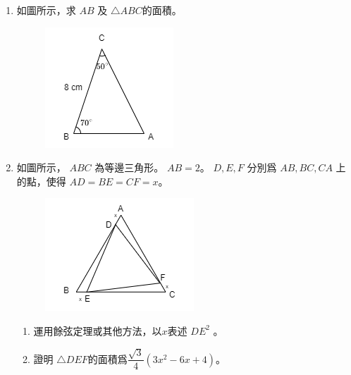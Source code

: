 \documentclass[11pt]{article}
\begin{document}
\begin{enumerate}
        \hrulefill
            
        \hrulefill
        
        \hrulefill
        
        \hrulefill
            
        \hrulefill
        
        \hrulefill

    \item 如圖所示，求 $AB$ 及 $\triangle ABC$的面積。\begin{figure}[H]
        \centering
        \includegraphics[scale=0.8]{f4finalq39.png}
    \end{figure}

    
        
        \hrulefill
            
        \hrulefill
        
        \hrulefill
        
        \hrulefill
        
        \hrulefill
        
        \hrulefill
        
        \hrulefill
        
        \hrulefill

    \pagebreak
    \item 如圖所示， $ABC$ 為等邊三角形。 $AB=2$。 $D,E,F$ 分別爲 $AB,BC,CA$ 上的點，使得 $AD=BE=CF=x$。\begin{figure}[H]
        \centering
        \includegraphics[scale=0.8]{f4finalq40.png}
    \end{figure}\begin{enumerate}
        \item 運用餘弦定理或其他方法，以$x$表述 $DE^2$ 。
        \item 證明 $\triangle DEF$的面積爲$\dfrac{\sqrt{3}}{4}(3x^2-6x+4)$。
    \end{enumerate}
    \hrulefill
            

\end{enumerate}
\end{document}
